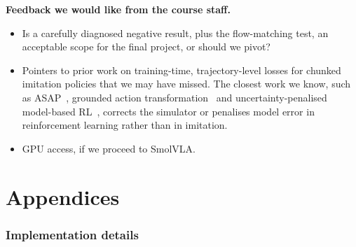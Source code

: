 \textbf{Feedback we would like from the course staff.}
\begin{itemize}[leftmargin=*, itemsep=2pt]
  \item Is a carefully diagnosed negative result, plus the flow-matching test, an acceptable scope for the final project, or should we pivot?
  \item Pointers to prior work on training-time, trajectory-level losses for chunked imitation policies that we may have missed. The closest work we know, such as ASAP~\cite{he2025asap}, grounded action transformation~\cite{hanna2021gat} and uncertainty-penalised model-based RL~\cite{yu2020mopo}, corrects the simulator or penalises model error in reinforcement learning rather than in imitation.
  \item GPU access, if we proceed to SmolVLA.
\end{itemize}



\newpage
\appendix
\onecolumn
\part*{Appendices}

\section{Implementation details}
\label{app:impl}

